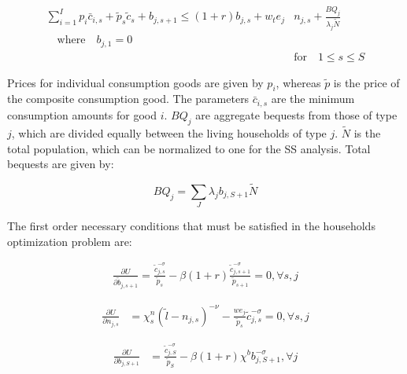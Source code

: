\documentclass[letterpaper,12pt]{article}
\theoremstyle{definition}
\begin{document}
\begin{spacing}{1.5}
     \begin{equation}\label{EqBC}
      \begin{split}
        \sum_{i=1}^{I} p_{i}\bar{c}_{i,s} + \tilde{p}_{s}\tilde{c}_{s} + b_{j,s+1} \leq \left(1 + r\right) b_{j,s} + w_t e_{j}&n_{j,s} + \frac{BQ_{j}}{\lambda_j\tilde{N}} \\
        \quad\text{where}\quad b_{j,1} = 0 \\
        &\text{for} \quad 1\leq s \leq S 
      \end{split}
    \end{equation}
    
  Prices for individual consumption goods are given by $p_{i}$, whereas $\tilde{p}$ is the price of the composite consumption good.  The parameters $\bar{c}_{i,s}$ are the minimum consumption amounts for good $i$.  $BQ_{j}$ are aggregate bequests from those of type $j$, which are divided equally between the living households of type $j$.  $\tilde{N}$ is the total population, which can be normalized to one for the SS analysis.  Total bequests are given by:
  
  \begin{equation}
  BQ_{j} = \sum_{J} \lambda_{j}b_{j,S+1}\tilde{N}
  \end{equation}
  
 The first order necessary conditions that must be satisfied in the households optimization problem are:
  
      \begin{equation}\label{Eqbfoc}
      \begin{split}
     \frac{\partial U}{\partial \tilde{b}_{j,s+1}}  = \frac{\tilde{c}_{j,s}^{-\sigma}}{\tilde{p}_{s}} - \beta (1+r) \frac{\tilde{c}_{j,s+1}^{-\sigma}}{\tilde{p}_{s+1}}  = 0, \forall s, j
        \end{split}
    \end{equation}

    \begin{equation}\label{Eqnfoc}
      \begin{split}
      \frac{\partial U}{\partial n_{j,s}} & =  \chi^n_{s}\left(\tilde{l}-n_{j,s}\right)^{-\nu} - \frac{we_{j}}{\tilde{p}_{s}}\tilde{c}_{j,s}^{-\sigma} = 0, \forall s, j       
      \end{split}
    \end{equation}

    \begin{equation}\label{Eqbqfoc}
      \begin{split}
      \frac{\partial U}{\partial b_{j,S+1}} & = \frac{\tilde{c}_{j,S}^{-\sigma}}{\tilde{p}_{S}} - \beta (1+r) \chi^{b} b_{j,S+1}^{-\sigma}, \forall j
      \end{split}
    \end{equation}
  

\end{spacing}
\end{document}
